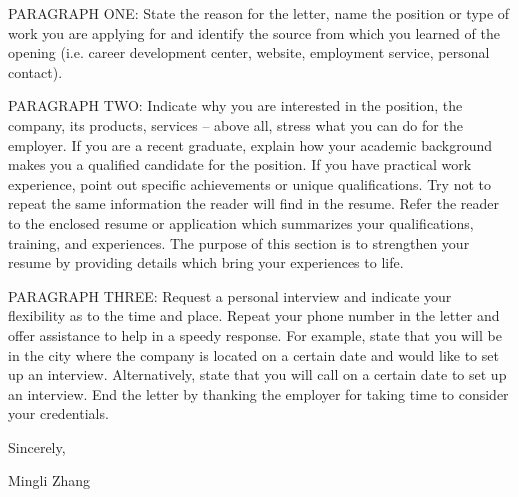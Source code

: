 \documentclass[
	12pt, %
]{letter}
\begin{document}

PARAGRAPH ONE: State the reason for the letter, name the position or type of work you are applying for and identify the source from which you learned of the opening (i.e. career development center, website, employment service, personal contact).

PARAGRAPH TWO: Indicate why you are interested in the position, the company, its products, services -- above all, stress what you can do for the employer. If you are a recent graduate, explain how your academic background makes you a qualified candidate for the position. If you have practical work experience, point out specific achievements or unique qualifications. Try not to repeat the same information the reader will find in the resume. Refer the reader to the enclosed resume or application which summarizes your qualifications, training, and experiences. The purpose of this section is to strengthen your resume by providing details which bring your experiences to life.

PARAGRAPH THREE: Request a personal interview and indicate your flexibility as to the time and place. Repeat your phone number in the letter and offer assistance to help in a speedy response. For example, state that you will be in the city where the company is located on a certain date and would like to set up an interview. Alternatively, state that you will call on a certain date to set up an interview. End the letter by thanking the employer for taking time to consider your credentials.

\smallskip %

Sincerely,

\bigskip\bigskip\bigskip %

Mingli Zhang

\end{document}
